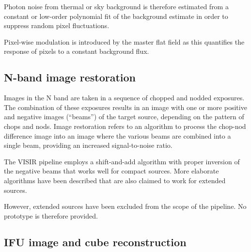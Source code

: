 Photon noise from thermal or sky background is therefore estimated
from a constant or low-order polynomial fit of the background estimate
in order to suppress random pixel fluctuations.

Pixel-wise modulation is introduced by the master flat field as this
quantifies the response of pixels to a constant background flux.

\subsection{N-band image restoration}
\label{ssec:criticalnbandimagerestoration}
\label{ssec:image_restoration}


Images in the N band are taken in a sequence of chopped and nodded
exposures. The combination of these exposures results in an image with
one or more positive and negative images (``beams'') of the target
source, depending on the pattern of chops and nods. Image restoration
refers to an algorithm to process the chop-nod difference image into
an image where the various beams are combined into a single beam,
providing an increased signal-to-noise ratio.

The VISIR pipeline employs a shift-and-add algorithm with proper
inversion of the negative beams that works well for compact sources.
More elaborate algorithms have been
described that are also claimed to work for extended sources.

However, extended sources have been excluded from the scope of the pipeline.
No prototype is therefore provided.


\subsection{IFU image and cube reconstruction}
\label{ssec:criticalifuimageandcubereconstruction}
\label{ssec:image_reconstruction}

